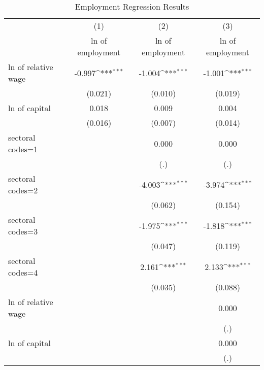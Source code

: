 \begin{table}[htbp]\centering
\def\sym#1{\ifmmode^{#1}\else\(^{#1}\)\fi}
\caption{Employment Regression Results}
\begin{tabular}{l*{3}{c}}
\hline\hline
                    &\multicolumn{1}{c}{(1)}&\multicolumn{1}{c}{(2)}&\multicolumn{1}{c}{(3)}\\
                    &\multicolumn{1}{c}{ln of employment}&\multicolumn{1}{c}{ln of employment}&\multicolumn{1}{c}{ln of employment}\\
\hline
ln of relative wage &      -0.997\sym{***}&      -1.004\sym{***}&      -1.001\sym{***}\\
                    &     (0.021)         &     (0.010)         &     (0.019)         \\
[1em]
ln of capital       &       0.018         &       0.009         &       0.004         \\
                    &     (0.016)         &     (0.007)         &     (0.014)         \\
[1em]
sectoral codes=1    &                     &       0.000         &       0.000         \\
                    &                     &         (.)         &         (.)         \\
[1em]
sectoral codes=2    &                     &      -4.003\sym{***}&      -3.974\sym{***}\\
                    &                     &     (0.062)         &     (0.154)         \\
[1em]
sectoral codes=3    &                     &      -1.975\sym{***}&      -1.818\sym{***}\\
                    &                     &     (0.047)         &     (0.119)         \\
[1em]
sectoral codes=4    &                     &       2.161\sym{***}&       2.133\sym{***}\\
                    &                     &     (0.035)         &     (0.088)         \\
[1em]
ln of relative wage &                     &                     &       0.000         \\
                    &                     &                     &         (.)         \\
[1em]
ln of capital       &                     &                     &       0.000         \\
                    &                     &                     &         (.)         \\

\end{tabular}
\end{table}
